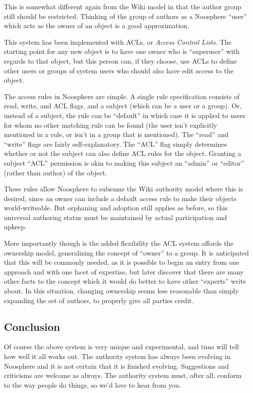 This is somewhat different again from the Wiki model in that the author group still should be restricted. Thinking of the group of authors as a Noosphere ``user'' which acts as the owner of an object is a good approximation.

This system has been implemented with ACLs, or \emph{Access Control Lists}. The starting point for any new object is to have one owner who is ``superuser'' with regards to that object, but this person can, if they choose, use ACLs to define other users or groups of system users who should also have edit access to the object.

The access rules in Noosphere are simple. A single rule specification consists of read, write, and ACL flags, and a subject (which can be a user or a group). Or, instead of a subject, the rule can be ``default'' in which case it is applied to users for whom no other matching rule can be found (the user isn't explicitly mentioned in a rule, or isn't in a group that is mentioned). The ``read'' and ``write'' flags are fairly self-explanatory. The ``ACL'' flag simply determines whether or not the subject can also define ACL rules for the object. Granting a subject ``ACL'' permission is akin to making this subject an ``admin'' or ``editor'' (rather than author) of the object.

These rules allow Noosphere to subsume the Wiki authority model where this is desired, since an owner can include a default access rule to make their objects world-writeable. But orphaning and adoption still applies as before, so this universal authoring status must be maintained by actual participation and upkeep.

More importantly though is the added flexibility the ACL system affords the ownership model, generalizing the concept of ``owner'' to a group. It is anticipated that this will be commonly needed, as it is possible to begin an entry from one approach and with one facet of expertise, but later discover that there are many other facts to the concept which it would do better to have other ``experts'' write about. In this situation, changing ownership seems less reasonable than simply expanding the set of authors, to properly give all parties credit.

\subsection*{Conclusion}
Of course the above system is very unique and experimental, and time will tell how well it all works out. The authority system has always been evolving in Noosphere and it is not certain that it is finished evolving. Suggestions and criticisms are welcome as always. The authority system must, after all, conform to the way people do things, so we'd love to hear from you.



